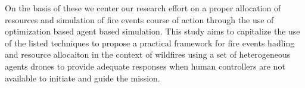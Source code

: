 \documentclass[preprint,review, 11pt,3p,authoryear]{elsarticle}
\newcommand{\rev}{\color{black}} %
\begin{document}
On the basis of these we center our research effort on a proper allocation of resources and simulation of fire events course of action through the use of optimization based agent based simulation.
This study aims to capitalize the use of the listed techniques to propose a practical framework for fire events hadling and resource allocaiton in the context of wildfires using a set of heterogeneous agents drones to provide adequate responses when human controllers are not available to initiate and guide the mission.




\end{document}
